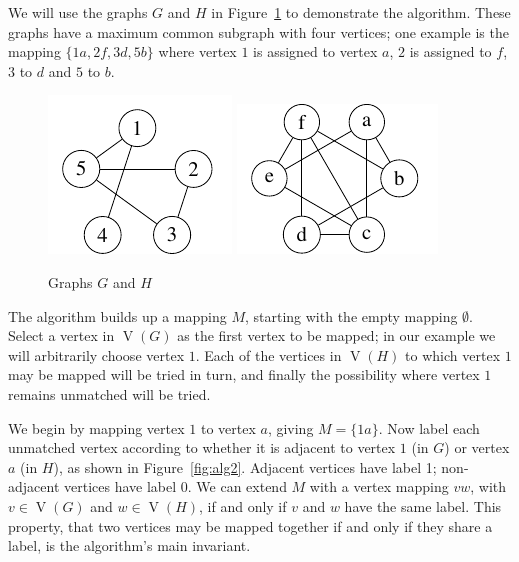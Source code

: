 \documentclass[letterpaper]{article}
\DeclareMathOperator{\V}{V}
\begin{document}
We will use the graphs $G$ and $H$ in Figure~\ref{fig:alg1} to demonstrate the
algorithm.  These graphs have a maximum common subgraph with four vertices; one
example is the mapping $\{1a, 2f, 3d, 5b\}$ where vertex $1$ is assigned to
vertex $a$, $2$ is assigned to $f$, $3$ to $d$ and $5$ to $b$.

\begin{figure}[ht]
\centering
    \includegraphics{graph_G}
    \includegraphics{graph_H}
\caption{Graphs $G$ and $H$}
\label{fig:alg1}
\end{figure}

The algorithm builds up a mapping $M$, starting with the empty mapping
$\emptyset$. Select a vertex in $\V(G)$ as the first vertex to be mapped; in
our example we will arbitrarily choose vertex $1$. Each of the vertices in
$\V(H)$ to which vertex $1$ may be mapped will be tried in turn, and finally the
possibility where vertex $1$ remains unmatched will be tried.

We begin by mapping vertex $1$ to vertex $a$, giving $M=\{1a\}$.  Now label
each unmatched vertex according to whether it is adjacent to vertex $1$ (in
$G$) or vertex $a$ (in $H$), as shown in Figure~\ref{fig:alg2}.  Adjacent
vertices have label 1; non-adjacent vertices have label 0.  We can extend $M$
with a vertex mapping $vw$, with $v \in \V(G)$ and $w \in \V(H)$, if and only
if $v$ and $w$ have the same label.  This property, that two vertices may be
mapped together if and only if they share a label, is the algorithm's main
invariant.
\end{document}
